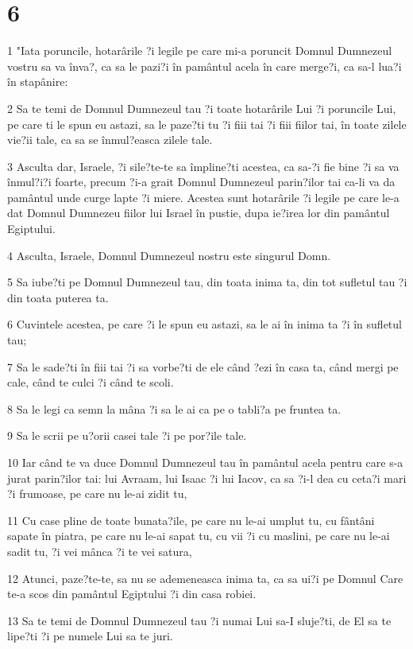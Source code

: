 \chapter{6}

\par 1 "Iata poruncile, hotarârile ?i legile pe care mi-a poruncit Domnul Dumnezeul vostru sa va înva?, ca sa le pazi?i în pamântul acela în care merge?i, ca sa-l lua?i în stapânire:
\par 2 Sa te temi de Domnul Dumnezeul tau ?i toate hotarârile Lui ?i poruncile Lui, pe care ti le spun eu astazi, sa le paze?ti tu ?i fiii tai ?i fiii fiilor tai, în toate zilele vie?ii tale, ca sa se înmul?easca zilele tale.
\par 3 Asculta dar, Israele, ?i sile?te-te sa împline?ti acestea, ca sa-?i fie bine ?i sa va înmul?i?i foarte, precum ?i-a grait Domnul Dumnezeul parin?ilor tai ca-li va da pamântul unde curge lapte ?i miere. Acestea sunt hotarârile ?i legile pe care le-a dat Domnul Dumnezeu fiilor lui Israel în pustie, dupa ie?irea lor din pamântul Egiptului.
\par 4 Asculta, Israele, Domnul Dumnezeul nostru este singurul Domn.
\par 5 Sa iube?ti pe Domnul Dumnezeul tau, din toata inima ta, din tot sufletul tau ?i din toata puterea ta.
\par 6 Cuvintele acestea, pe care ?i le spun eu astazi, sa le ai în inima ta ?i în sufletul tau;
\par 7 Sa le sade?ti în fiii tai ?i sa vorbe?ti de ele când ?ezi în casa ta, când mergi pe cale, când te culci ?i când te scoli.
\par 8 Sa le legi ca semn la mâna ?i sa le ai ca pe o tabli?a pe fruntea ta.
\par 9 Sa le scrii pe u?orii casei tale ?i pe por?ile tale.
\par 10 Iar când te va duce Domnul Dumnezeul tau în pamântul acela pentru care s-a jurat parin?ilor tai: lui Avraam, lui Isaac ?i lui Iacov, ca sa ?i-l dea cu ceta?i mari ?i frumoase, pe care nu le-ai zidit tu,
\par 11 Cu case pline de toate bunata?ile, pe care nu le-ai umplut tu, cu fântâni sapate în piatra, pe care nu le-ai sapat tu, cu vii ?i cu maslini, pe care nu le-ai sadit tu, ?i vei mânca ?i te vei satura,
\par 12 Atunci, paze?te-te, sa nu se ademeneasca inima ta, ca sa ui?i pe Domnul Care te-a scos din pamântul Egiptului ?i din casa robiei.
\par 13 Sa te temi de Domnul Dumnezeul tau ?i numai Lui sa-I sluje?ti, de El sa te lipe?ti ?i pe numele Lui sa te juri.
